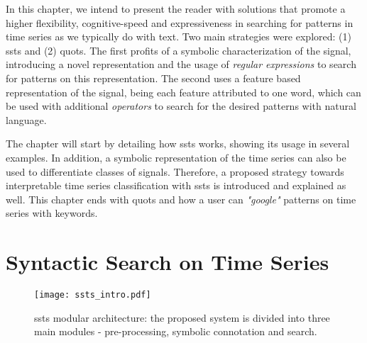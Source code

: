 \par
In this chapter, we intend to present the reader with solutions that promote a higher flexibility, cognitive-speed and expressiveness in searching for patterns in time series as we typically do with text. Two main strategies were explored: (1) \gls{ssts} and (2) \gls{quots}. The first profits of a symbolic characterization of the signal, introducing a novel representation and the usage of \textit{regular expressions} to search for patterns on this representation. The second uses a feature based representation of the signal, being each feature attributed to one word, which can be used with additional \textit{operators} to search for the desired patterns with natural language. 
\par
The chapter will start by detailing how \gls{ssts} works, showing its usage in several examples. In addition, a symbolic representation of the time series can also be used to differentiate classes of signals. Therefore, a proposed strategy towards interpretable time series classification with \gls{ssts} is introduced and explained as well. This chapter ends with \gls{quots} and how a user can \textit{"google"} patterns on time series with keywords.







\section{Syntactic Search on Time Series}

\begin{figure}
\centering
\texttt{[image: ssts\_intro.pdf]}
\label{fig:ssts_intro}
\caption{\gls{ssts} modular architecture: the proposed system is divided into three main modules - pre-processing, symbolic connotation and search.}
\end{figure}

